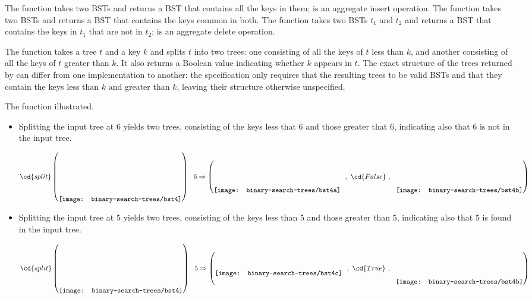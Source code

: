 %
The function  takes two BSTs and returns a BST that
contains all the keys in them;  is an aggregate insert
operation.
% 
The function  takes two BSTs and returns a BST
that contains the keys common in both.
% 
The function  takes two BSTs $t_1$ and $t_2$ and returns
a BST that contains the keys in $t_1$ that are not in $t_2$;
 is an aggregate delete operation.

The function  takes a tree $t$ and a key $k$ and
splits $t$ into two trees: one consisting of all the keys of $t$ less
than $k$, and another consisting of all the keys of $t$ greater than
$k$.  
%
It also returns a Boolean value indicating whether $k$ appears in $t$.
%
The exact structure of the trees returned by  can differ
from one implementation to another: the specification only requires
that the resulting trees to be valid BSTs and that they contain the
keys less than $k$ and greater than $k$, leaving their structure
otherwise unspecified.



\begin{example}

The function  illustrated.

\begin{itemize}
\item 
Splitting the input tree at $6$ yields two trees, consisting of the
keys less that $6$ and those greater that $6$, indicating also that
$6$ is not in the input tree. 

\[
\cd{split}
\left(
\raisebox{-.45in}{\texttt{[image: binary-search-trees/bst4]}}
\right)
~~6
\Rightarrow 
\left(
\raisebox{-.27in}{\texttt{[image: binary-search-trees/bst4a]}}~~,
~\cd{False}~,~~
\raisebox{-.27in}{\texttt{[image: binary-search-trees/bst4b]}}
\right) 
\]

\item 
Splitting the input tree at $5$ yields two trees, consisting of the
keys less than $5$ and those greater than $5$, indicating also that
$5$ is found in the input tree. 


\[
\cd{split}
\left(
\raisebox{-.45in}{\texttt{[image: binary-search-trees/bst4]}}
\right) 
~~5
\Rightarrow 
\left(
\raisebox{-.1in}{\texttt{[image: binary-search-trees/bst4c]}}~~,
~\cd{True}~,~~
\raisebox{-.27in}{\texttt{[image: binary-search-trees/bst4b]}}
\right) 
\]
\end{itemize}
\end{example}

